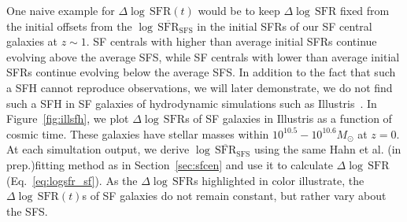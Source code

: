 \documentclass[12pt, letterpaper, preprint]{aastex}
\newcommand{\logsfr}{\log \, \mathrm{SFR}}
\newcommand{\musfms}{\log\,\overline{\mathrm{SFR}}_\mathrm{SFS}}
\newcommand{\hahngmm}{Hahn et al. (in prep.)}
\begin{document}
One naive example for $\Delta \logsfr(t)$ would be to keep 
$\Delta \logsfr$ fixed from the initial offsets from the $\musfms$
in the initial SFRs of our SF central galaxies at $z\sim1$.
SF centrals with higher than average initial SFRs continue evolving 
above the average SFS, while SF centrals with lower than average 
initial SFRs continue evolving below the average SFS. In addition to 
the fact that such a SFH cannot reproduce observations, we will later 
demonstrate, we do not find such a SFH in SF galaxies of hydrodynamic 
simulations such as Illustris~\cite{vogelsberger2014,genel2014}. 
In Figure~\ref{fig:illsfh}, we plot $\Delta \logsfr$s of SF galaxies 
in Illustris as a function of cosmic time. These galaxies have stellar 
masses within $10^{10.5}-10^{10.6}M_\odot$ at $z=0$. At each simultation 
output, we derive $\musfms$ using the same \hahngmm fitting method as in
Section~\ref{sec:sfcen} and use it to calculate $\Delta \logsfr$ 
(Eq.~\ref{eq:logsfr_sf}). As the $\Delta \logsfr$s highlighted in color 
illustrate, the $\Delta \logsfr(t)$s of SF galaxies do not remain constant, 
but rather vary about the SFS. 
\end{document}
